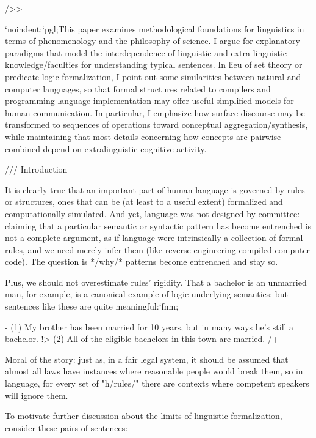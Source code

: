 
/>>


`noindent;`pgl;This paper examines methodological foundations for 
linguistics in terms of phenomenology and the 
philosophy of science.  I argue for explanatory 
paradigms that model the interdependence of 
linguistic and extra-linguistic knowledge/faculties 
for understanding typical sentences.  In lieu 
of set theory or predicate logic formalization, I 
point out some similarities between natural and computer 
languages, so that formal structures related to 
compilers and programming-language implementation 
may offer useful simplified models for human 
communication.  In particular, I emphasize how 
surface discourse may be transformed to sequences 
of operations toward conceptual aggregation/synthesis, 
while maintaining that most details concerning how  
concepts are pairwise combined  
depend on extralinguistic cognitive activity. 


///  Introduction

It is clearly true that an important part of human language is governed by rules or 
structures, ones that can be (at least to a useful extent) formalized and computationally 
simulated.  And yet, language was not designed by committee: claiming that a 
particular semantic or syntactic pattern has become entrenched is not a 
complete argument, as if language were intrinsically a collection of formal rules, and we 
need merely infer them (like reverse-engineering compiled computer code).  The 
question is */why/* patterns become entrenched and stay so.  

Plus, we should not 
overestimate rules' rigidity.  That a bachelor is an unmarried man, for example, 
is a canonical example of logic underlying semantics; but sentences like 
these are quite meaningful:`fnm;


-%
(1)  My brother has been married for 10 years, but in many ways he's still a bachelor. !>
(2)  All of the eligible bachelors in this town are married.
/+

Moral of the story: just as, in a fair legal system, it should be assumed that 
almost all laws have instances where reasonable people would break them, so 
in language, for every set of "h/rules/" there are contexts where competent 
speakers will ignore them.  

To motivate further discussion about the limits of linguistic 
formalization, consider these pairs of sentences:

